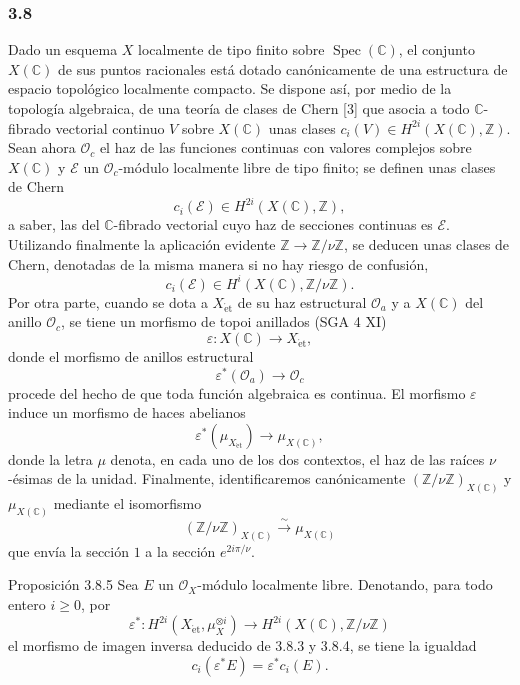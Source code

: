 \subsubsection*{3.8}
Dado un esquema $X$ localmente de tipo finito sobre $\operatorname{Spec}(\mathbb C)$, el conjunto $X(\mathbb C)$ de sus puntos racionales está dotado canónicamente de una estructura de espacio topológico localmente compacto. Se dispone así, por medio de la topología algebraica, de una teoría de clases de Chern [3] que asocia a todo $\mathbb C$-fibrado vectorial continuo $V$ sobre $X(\mathbb C)$ unas clases $c_i(V)\in H^{2i}(X(\mathbb C),\mathbb Z)$. Sean ahora $\mathcal O_c$ el haz de las funciones continuas con valores complejos sobre $X(\mathbb C)$ y $\mathcal E$ un $\mathcal O_c$-módulo localmente libre de tipo finito; se definen unas clases de Chern
\[
c_i(\mathcal E)\in H^{2i}(X(\mathbb C),\mathbb Z),
\]
a saber, las del $\mathbb C$-fibrado vectorial cuyo haz de secciones continuas es $\mathcal E$. Utilizando finalmente la aplicación evidente $\mathbb Z\to\mathbb Z/\nu\mathbb Z$, se deducen unas clases de Chern, denotadas de la misma manera si no hay riesgo de confusión,
\[
c_i(\mathcal E)\in H^i(X(\mathbb C),\mathbb Z/\nu\mathbb Z).
\tag{3.8.1}
\]
Por otra parte, cuando se dota a $X_{\mathrm{\acute et}}$ de su haz estructural $\mathcal O_a$ y a $X(\mathbb C)$ del anillo $\mathcal O_c$, se tiene un morfismo de topoi anillados (SGA 4 XI)
\[
\varepsilon:X(\mathbb C)\to X_{\mathrm{\acute et}},
\]
donde el morfismo de anillos estructural
\[
\varepsilon^*(\mathcal O_a)\to\mathcal O_c
\tag{3.8.2}
\]
procede del hecho de que toda función algebraica es continua. El morfismo $\varepsilon$ induce un morfismo de haces abelianos
\[
\varepsilon^*(\mu_{X_{\mathrm{\acute et}}})\to \mu_{X(\mathbb C)},
\tag{3.8.3}
\]
donde la letra $\mu$ denota, en cada uno de los dos contextos, el haz de las raíces $\nu$-ésimas de la unidad. Finalmente, identificaremos canónicamente $(\mathbb Z/\nu\mathbb Z)_{X(\mathbb C)}$ y $\mu_{X(\mathbb C)}$ mediante el isomorfismo
\[
(\mathbb Z/\nu\mathbb Z)_{X(\mathbb C)}
 \xrightarrow{\sim}\mu_{X(\mathbb C)}
\tag{3.8.4}
\]
que envía la sección $1$ a la sección $e^{2i\pi/\nu}$.

\begin{statement}{Proposición 3.8.5}
Sea $E$ un $\mathcal O_X$-módulo localmente libre. Denotando, para todo entero $i\ge0$, por
\[
\varepsilon^*:H^{2i}(X_{\mathrm{\acute et}},\mu_X^{\otimes i})
\to H^{2i}(X(\mathbb C),\mathbb Z/\nu\mathbb Z)
\]
el morfismo de imagen inversa deducido de 3.8.3 y 3.8.4, se tiene la igualdad
\[
c_i(\varepsilon^*E)=\varepsilon^*c_i(E).
\]
\end{statement}
